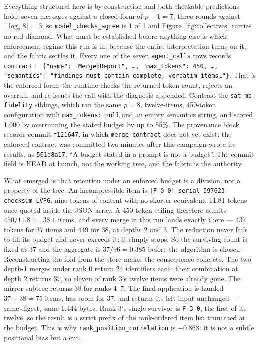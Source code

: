 \documentclass[11pt]{article}
\begin{document}
Everything structural here is by construction and both checkable predictions hold: seven
messages against a closed form of $p-1=7$, three rounds against $\lceil\log_2 8\rceil=3$,
so \texttt{model\_checks\_agree} is 1 of 1 and Figure~\ref{fig:collectives} carries no red
diamond. What must be established before anything else is which enforcement regime this
run is in, because the entire interpretation turns on it, and the fabric settles it. Every
one of the seven \texttt{agent\_calls} rows records \texttt{contract} =
\texttt{\{"name": "MergedReport", \dots, "max\_tokens": 450, \dots, "semantics": "findings
must contain complete, verbatim items\dots"\}}. That is the enforced form: the runtime
checks the returned token count, rejects an overrun, and re-issues the call with the
diagnosis appended. Contrast the \texttt{sat-mb-fidelity} siblings, which ran the same
$p=8$, twelve-items, 450-token configuration with \texttt{max\_tokens: null} and an empty
semantics string, and scored 1.000 by overrunning the stated budget by up to 55\%. The
provenance block records commit \texttt{f121647}, in which \texttt{merge\_contract} does
not yet exist; the enforced contract was committed two minutes after this campaign wrote
its results, as \texttt{561d8a17}, ``A budget stated in a prompt is not a budget''. The
commit field is HEAD at launch, not the working tree, and the fabric is the authority.

What emerged is that retention under an enforced budget is a division, not a property of
the tree. An incompressible item is \texttt{[F-0-0] serial 597623 checksum LVPG}: nine
tokens of content with no shorter equivalent, 11.81 tokens once quoted inside the JSON
array. A 450-token ceiling therefore admits $450/11.81 = 38.1$ items, and every merge in
this run lands exactly there --- 437 tokens for 37 items and 449 for 38, at depths 2 and
3. The reduction never fails to fill its budget and never exceeds it; it simply stops. So
the surviving count is fixed at 37 and the aggregate is $37/96 = 0.385$ before the
algorithm is chosen. Reconstructing the fold from the store makes the consequence concrete.
The two depth-1 merges under rank 0 return 24 identifiers each; their combination at depth
2 returns 37, so eleven of rank 3's twelve items were already gone. The mirror subtree
returns 38 for ranks 4--7. The final application is handed $37 + 38 = 75$ items, has room
for 37, and returns its left input unchanged --- same digest, same 1{,}444 bytes. Rank 3's
single survivor is \texttt{F-3-0}, the first of its twelve, so the result is a strict
prefix of the rank-ordered item list truncated at the budget. This is why
\texttt{rank\_position\_correlation} is $-0.863$: it is not a subtle positional bias but a
cut.
\end{document}
